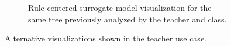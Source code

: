 \begin{figure}[ht]
\begin{subfigure}[c]{0.48\textwidth}
        \caption{Rule centered surrogate model visualization for the same tree previously analyzed by the teacher and class.}
        \label{fig:teaching_spawn_tree}
    \end{subfigure}
    \caption{Alternative visualizations shown in the teacher use case.}
\end{figure}

